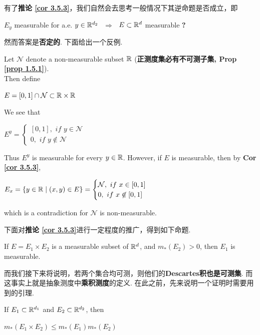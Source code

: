 	\vspace{4em}
	有了\textbf{推论 \ref{cor 3.5.3}}，我们自然会去思考一般情况下其逆命题是否成立，即
	\begin{center}
		$E_y$ measurable for a.e. $y \in \mathbb{R}^{d_2}$ $\,\, \Rightarrow \,\,$ $E \subset \mathbb{R}^d$ measurable \textbf{?}
	\end{center}
	然而答案是\textbf{否定的}. 下面给出一个反例.
	\begin{example}\label{ex 3.5.1}
		Let $\mathcal{N}$ denote a non-measurable subset $\mathbb{R}$ (\textbf{正测度集必有不可测子集, Prop \ref{prop 1.5.1}}). \\
		Then define
		\begin{center}
			$E = [0 , 1] \cap \mathcal{N} \subset \mathbb{R} \times \mathbb{R}$
		\end{center}
		We see that
		\begin{center}
			$E^y = 
			\begin{cases}
				[0 , 1] , \,\, if \,\, y \in \mathcal{N} \\
				0 , \,\, if \,\, y \not\in \mathcal{N}
			\end{cases}$
		\end{center}
		Thus $E^y$ is measurable for every $y \in \mathbb{R}$. However, if $E$ is measurable, then by \textbf{Cor \ref{cor 3.5.3}},
		\begin{center}
			$E_x = \{ y \in \mathbb{R} \mid (x , y) \in E \} = 
			\begin{cases}
				\mathcal{N} , \,\, if \,\, x \in [0 , 1] \\
				0 , \,\, if \,\, x \not\in [0 , 1]
			\end{cases}$
		\end{center}
		which is a contradiction for $\mathcal{N}$ is non-measurable.
	\end{example}

	\newpage
	下面对\textbf{推论 \ref{cor 3.5.3}}进行一定程度的推广，得到如下命题.
	\begin{proposition}\label{prop 3.5.1}
		If $E = E_1 \times E_2$ is a measurable subset of $\mathbb{R}^{d}$, and $m_{*}(E_2) > 0$, then $E_1$ is measurable.
	\end{proposition}

	\vspace{4em}
	而我们接下来将说明，若两个集合均可测，则他们的\textbf{Descartes积也是可测集}. 而这事实上就是抽象测度中\textbf{乘积测度}的定义. 在此之前，先来说明一个证明时需要用到的引理.
	\begin{lemma}\label{lemma 3.5.4}
		If $E_1 \subset \mathbb{R}^{d_1}$ and $E_2 \subset \mathbb{R}^{d_2}$, then
		\begin{center}
			$m_{*}(E_1 \times E_2) \leq m_{*}(E_1) m_{*}(E_2)$
		\end{center}
	\end{lemma}
	
